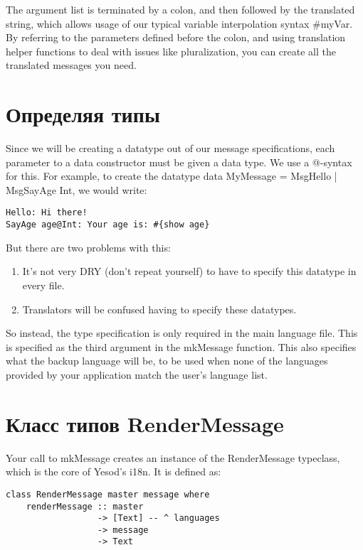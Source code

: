 The argument list is terminated by a colon, and then followed by the translated string, which allows usage of our typical variable interpolation syntax #{myVar}. By referring to the parameters defined before the colon, and using translation helper functions to deal with issues like pluralization, you can create all the translated messages you need.

\section{Определяя типы} %

Since we will be creating a datatype out of our message specifications, each parameter to a data constructor must be given a data type. We use a @-syntax for this. For example, to create the datatype data MyMessage = MsgHello | MsgSayAge Int, we would write:

\begin{lstlisting}
Hello: Hi there!
SayAge age@Int: Your age is: #{show age}
\end{lstlisting}

But there are two problems with this:

\begin{enumerate}
  \item It's not very DRY (don't repeat yourself) to have to specify this datatype in every file.
  \item Translators will be confused having to specify these datatypes.
\end{enumerate}

So instead, the type specification is only required in the main language file. This is specified as the third argument in the mkMessage function. This also specifies what the backup language will be, to be used when none of the languages provided by your application match the user's language list.

\section{Класс типов RenderMessage} %

Your call to mkMessage creates an instance of the RenderMessage typeclass, which is the core of Yesod's i18n. It is defined as:
\begin{lstlisting}
class RenderMessage master message where
    renderMessage :: master
                  -> [Text] -- ^ languages
                  -> message
                  -> Text 
\end{lstlisting}

